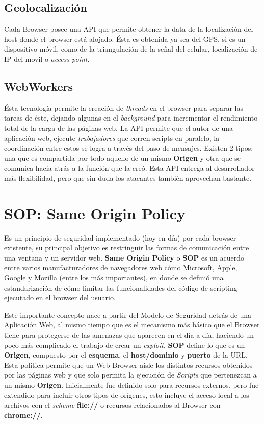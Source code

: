     \subsection{Geolocalización}
    Cada Browser posee una API que permite obtener la data de la localización del host donde el browser está alojado. Ésta es obtenida ya sea del GPS, si es un dispositivo móvil, como de la triangulación de la señal del celular, localización de IP del movil o \textit{access point}.

    \subsection{WebWorkers}
    \label{chap2:WWs}
    Ésta tecnología permite la creación de \textit{threads} en el browser para separar las tareas de éste, dejando algunas en el \textit{background} para incrementar el rendimiento total de la carga de las páginas web. La API permite que el autor de una aplicación web, ejecute \textit{trabajadores} que corren scripts en paralelo, la coordinación entre estos se logra a través del paso de mensajes. Existen 2 tipos: una que es compartida por todo aquello de un mismo \textbf{Origen} y otra que se comunica hacia atrás a la función que la creó. Esta API entrega al desarrollador más flexibilidad, pero que sin duda los atacantes también aprovechan bastante.



\section{SOP: Same Origin Policy} %
    \label{chap2:SOP}

    Es un principio de seguridad implementado (hoy en día) por cada browser existente, su principal objetivo es restringuir las formas de comunicación entre una ventana y un servidor web. \textbf{Same Origin Policy} o \textbf{SOP} es un acuerdo entre varios manufacturadores de navegadores web cómo Microsoft, Apple, Google y Mozilla (entre los más importantes), en donde se definió una estandarización de cómo limitar las funcionalidades del código de scripting ejecutado en el browser del usuario. 

    Este importante concepto nace a partir del Modelo de Seguridad detrás de una Aplicación Web, al mismo tiempo que es el mecanismo más básico que el Browser tiene para protegerse de las amenazas que aparecen en el día a día, haciendo un poco más complicado el trabajo de crear un \textit{exploit}. \textbf{SOP} define lo que es un \textbf{Origen}, compuesto por el \textbf{esquema}, el \textbf{host/dominio} y \textbf{puerto} de la URL. Esta política permite que un Web Browser aisle los distintos recursos obtenidos por las páginas web y que solo permita la ejecución de \textit{Scripts} que pertenezcan a un mismo \textbf{Origen}. Inicialmente fue definido solo para recursos externos, pero fue extendido para incluir otros tipos de orígenes, esto incluye el acceso local a los archivos con el \textit{scheme} \textbf{file://} o recursos relacionados al Browser con \textbf{chrome://}.

